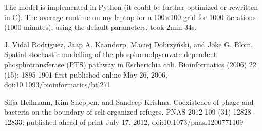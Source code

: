 \documentclass{article}
\begin{document}
The model is implemented in Python (it could be further optimized or rewritten in C). The average runtime on my laptop for a 100$\times$100 grid for 1000 iterations (1000 minutes), using the default parameters, took 2min 34s.

\begin{thebibliography}{1}

 J. Vidal Rodríguez, Jaap A. Kaandorp, Maciej Dobrzyński, and Joke G. Blom. Spatial stochastic modelling of the phosphoenolpyruvate-dependent phosphotransferase (PTS) pathway in Escherichia coli. Bioinformatics (2006) 22 (15): 1895-1901 first published online May 26, 2006, doi:10.1093/bioinformatics/btl271

 Silja Heilmann, Kim Sneppen, and Sandeep Krishna.
Coexistence of phage and bacteria on the boundary of self-organized refuges.
PNAS 2012 109 (31) 12828-12833; published ahead of print July 17, 2012, doi:10.1073/pnas.1200771109

\end{thebibliography}
\end{document}
